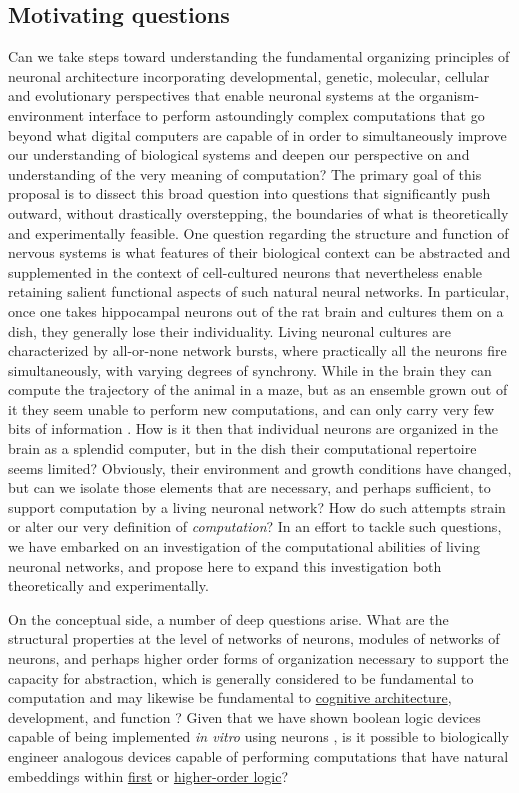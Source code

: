 \subsection{Motivating questions}
Can we take steps toward understanding the fundamental organizing principles of neuronal architecture incorporating developmental, genetic, molecular, cellular and evolutionary perspectives that enable neuronal systems at the organism-environment interface to perform astoundingly complex computations that go beyond what digital computers are capable of in order to simultaneously improve our understanding of biological systems and deepen our perspective on and understanding of the very meaning of computation? The primary goal of this proposal is to dissect this broad question into questions that significantly push outward, without drastically overstepping, the boundaries of what is theoretically and experimentally feasible. One question regarding the structure and function of nervous systems is what features of their biological context can be abstracted and supplemented in the context of cell-cultured neurons that nevertheless enable retaining salient functional aspects of such natural neural networks. In particular, once one takes hippocampal neurons out of the rat brain and cultures them on a dish, they generally lose their individuality. Living neuronal cultures are characterized by all-or-none network bursts, where practically all the neurons fire simultaneously, with varying degrees of synchrony. While in the brain they can compute the trajectory of the animal in a maze, but as an ensemble grown out of it they seem unable to perform new computations, and can only carry very few bits of information \cite{Feinerman2006}. How is it then that individual neurons are organized in the brain as a splendid computer, but in the dish their computational repertoire seems limited? Obviously, their environment and growth conditions have changed, but can we isolate those elements that are necessary, and perhaps sufficient, to support computation by a living neuronal network? How do such attempts strain or alter our very definition of {\it computation}? In an effort to tackle such questions, we have embarked on an investigation of the computational abilities of living neuronal networks, and propose here to expand this investigation both theoretically and experimentally.

On the conceptual side, a number of deep questions arise. What are the structural properties at the level of networks of neurons,
modules of networks of neurons, and perhaps higher order forms of
organization necessary to support the capacity for
abstraction, which is generally considered to be fundamental to computation \cite{Abelson1996} and may likewise be fundamental to
\href{http://en.wikipedia.org/wiki/Cognitive\_architecture}{cognitive
architecture}, development, and function \cite{Tenenbaum2011}? Given that we have shown boolean
logic devices capable of being implemented {\em in vitro} using
neurons \cite{Feinerman2008}, is it possible to biologically engineer analogous
devices capable of performing computations that have natural embeddings
within \href{http://en.wikipedia.org/wiki/First-order\_logic}{first} or
\href{http://en.wikipedia.org/wiki/Higher\_order\_logic}{higher-order
logic}?

